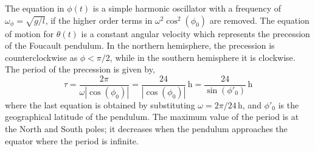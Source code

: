 \documentclass[12pt]{article}
\begin{document}
The equation in $\phi(t)$ is a simple harmonic oscillator with a frequency of
$\omega_\phi = \sqrt{g/l}$, if the higher order terms in $\omega^2\cos^2(\phi_0)$ are
removed. The equation of motion for $\theta(t)$ is a constant angular velocity which
represents the precession of the Foucault pendulum. In the northern hemisphere, the
precession is counterclockwise as $\phi < \pi/2$, while in the southern hemisphere it is
clockwise. The period of the precession is given by,
\begin{equation}
  \tau = \frac{2\pi}{\omega|\cos(\phi_0)|}
    = \frac{24}{|\cos(\phi_0)|}\,\text{h}
    = \frac{24}{\sin(\phi'_0)}\,\text{h}
\end{equation}
where the last equation is obtained by substituting $\omega = 2\pi/24\,\text{h}$, and
$\phi'_0$ is the geographical latitude of the pendulum. The maximum value of the period is
at the North and South poles; it decreases when the pendulum approaches the equator where the
period is infinite.
\end{document}
